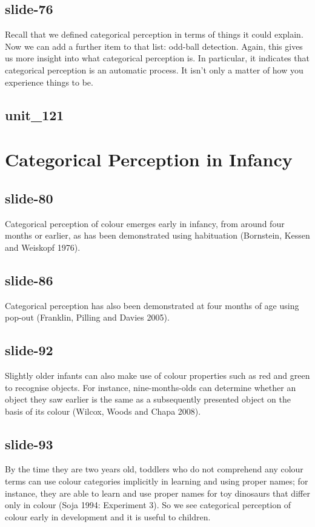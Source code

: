 \documentclass[12pt,\papersize]{extarticle}
\begin{document}
 
\subsection{slide-76}
Recall that we defined categorical perception in terms of things it could explain.
Now we can add a further item to that list: odd-ball detection.
Again, this gives us more insight into what categorical perception is.
In particular, it indicates that categorical perception is an automatic process.
It isn't only a matter of how you experience things to be.
 
 
\subsection{unit\_121}
 
\section{Categorical Perception in Infancy}
 
 
\subsection{slide-80}
Categorical perception of colour emerges early in infancy, from around four months or earlier, as has been demonstrated using habituation (Bornstein, Kessen and Weiskopf 1976).
 
 
\subsection{slide-86}
Categorical perception has also been demonstrated at four months of age using pop-out (Franklin, Pilling and Davies 2005).
 
 
\subsection{slide-92}
Slightly older infants can also make use of colour properties such as red and green to recognise objects. For instance, nine-months-olds can determine whether an object they saw earlier is the same as a subsequently presented object on the basis of its colour (Wilcox, Woods and Chapa 2008).
 
 
\subsection{slide-93}
By the time they are two years old, toddlers who do not comprehend any colour terms can use colour categories implicitly in learning and using proper names; for instance, they are able to learn and use proper names for toy dinosaurs that differ only in colour (Soja 1994: Experiment 3).
So we see categorical perception of colour early in development and it is useful to children.
 
\end{document}
